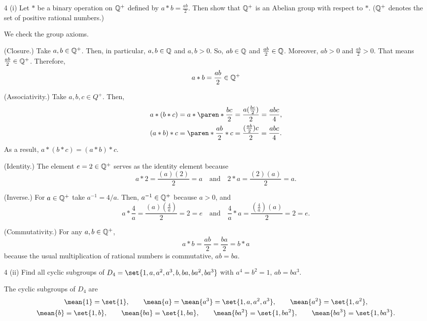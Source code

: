 \documentclass[11pt]{penrose}
\let\cyclic\mean
\begin{document}
\begin{problem}{4 (i)}
    Let $*$ be a binary operation on $\mathbb{Q}^{+}$ defined by $a * b = \frac{ab}{2}$. Then show that $\mathbb{Q}^{+}$ is an Abelian group with respect to $*$. ($\mathbb{Q}^{+}$ denotes the set of positive rational numbers.)

    \solution We check the group axioms.

    (Closure.) Take $a, b \in \mathbb{Q}^+$. Then, in particular, $a, b \in \mathbb{Q}$ and $a, b > 0$. So, $ab \in \mathbb{Q}$ and $\frac{ab}{2} \in \mathbb{Q}$. Moreover, $ab > 0$ and $\frac{ab}{2} > 0$. That means $\frac{ab}{2} \in \mathbb{Q}^+$. Therefore,
    \begin{equation*}
        a * b = \frac{ab}{2} \in \mathbb{Q}^+
    \end{equation*}


    (Associativity.) Take $a, b, c \in Q^+$. Then,
    \begin{align*}
        a * (b * c) &= a * \paren*{\frac{bc}{2}} = \frac{a(\frac{bc}{2})}{2} = \frac{abc}{4},\\
        (a * b) * c &= \paren*{\frac{ab}{2}} * c = \frac{(\frac{ab}{2})c}{2} = \frac{abc}{4}.
    \end{align*}
    As a result, $a * (b * c) = (a * b) * c$.

    (Identity.) The element $e = 2 \in \mathbb{Q}^+$ serves as the identity element because
    \begin{equation*}
        a * 2 = \frac{(a)(2)}{2} = a
        \quad\text{and}\quad
        2 * a = \frac{(2)(a)}{2} = a.
    \end{equation*}

    (Inverse.) For $a \in \mathbb{Q}^+$ take $a^{-1} = 4/a$. Then, $a^{-1} \in \mathbb{Q}^+$ because $a > 0$, and
    \begin{equation*}
        a * \frac{4}{a} = \frac{(a)(\frac{4}{a})}{2} = 2 = e
        \quad\text{and}\quad
        \frac{4}{a} * a = \frac{(\frac{4}{a})(a)}{2} = 2 = e.
    \end{equation*}

    (Commutativity.) For any $a, b \in \mathbb{Q}^+$,
    \begin{equation*}
        a * b = \frac{ab}{2} = \frac{ba}{2} = b * a
    \end{equation*}
    because the usual multiplication of rational numbers is commutative, $ab = ba$.
\end{problem}

\begin{problem}{4 (ii)}
    Find all cyclic subgroups of $D_4 = \set{1, a, a^2, a^3, b, ba, ba^2, ba^3}$ with $a^4 = b^2 = 1$, $ab = ba^3$.

    \solution The cyclic subgroups of $D_4$ are
    \begin{gather*}
        \cyclic{1} = \set{1}, \qquad
        \cyclic{a} = \cyclic{a^3} = \set{1, a, a^2, a^3}, \qquad
        \cyclic{a^2} = \set{1, a^2},\\
        \cyclic{b} = \set{1, b}, \qquad
        \cyclic{ba} = \set{1, ba}, \qquad
        \cyclic{ba^2} = \set{1, ba^2}, \qquad
        \cyclic{ba^3} = \set{1, ba^3}.
    \end{gather*}
\end{problem}
\end{document}
